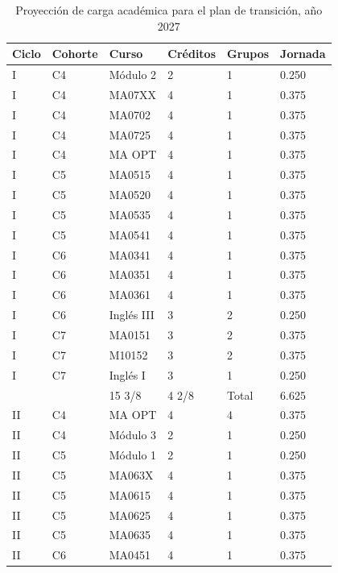 \begin{longtable}[c]{|l|l|l|l|l|l|}
\caption{Proyección de carga académica para el plan de transición, año 2027}
\label{tab:carga2027}\\
\hline
\rowcolor[HTML]{00C0F3}
Ciclo & Cohorte & Curso & Créditos & Grupos & Jornada \\ \hline
\endhead
%
I & C4 & Módulo 2 & 2 & 1 & 0.250 \\ \hline
I & C4 & MA07XX & 4 & 1 & 0.375 \\ \hline
I & C4 & MA0702 & 4 & 1 & 0.375 \\ \hline
I & C4 & MA0725 & 4 & 1 & 0.375 \\ \hline
I & C4 & MA OPT & 4 & 1 & 0.375 \\ \hline
I & C5 & MA0515 & 4 & 1 & 0.375 \\ \hline
I & C5 & MA0520 & 4 & 1 & 0.375 \\ \hline
I & C5 & MA0535 & 4 & 1 & 0.375 \\ \hline
I & C5 & MA0541 & 4 & 1 & 0.375 \\ \hline
I & C6 & MA0341 & 4 & 1 & 0.375 \\ \hline
I & C6 & MA0351 & 4 & 1 & 0.375 \\ \hline
I & C6 & MA0361 & 4 & 1 & 0.375 \\ \hline
I & C6 & Inglés III & 3 & 2 & 0.250 \\ \hline
I & C7 & MA0151 & 3 & 2 & 0.375 \\ \hline
I & C7 & M10152 & 3 & 2 & 0.375 \\ \hline
I & C7 & Inglés I & 3 & 1 & 0.250 \\ \hline
 &  & 15 3/8 & 4 2/8 & Total & 6.625 \\ \hline
II & C4 & MA OPT & 4 & 4 & 0.375 \\ \hline
II & C4 & Módulo 3 & 2 & 1 & 0.250 \\ \hline
II & C5 & Módulo 1 & 2 & 1 & 0.250 \\ \hline
II & C5 & MA063X & 4 & 1 & 0.375 \\ \hline
II & C5 & MA0615 & 4 & 1 & 0.375 \\ \hline
II & C5 & MA0625 & 4 & 1 & 0.375 \\ \hline
II & C5 & MA0635 & 4 & 1 & 0.375 \\ \hline
II & C6 & MA0451 & 4 & 1 & 0.375 \\ \hline

\end{longtable}

